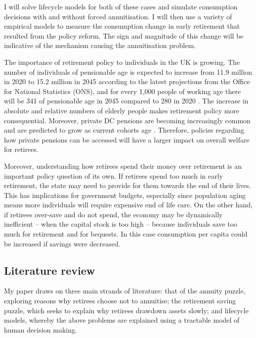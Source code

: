 \documentclass[12pt]{article}
\begin{document}
I will solve lifecycle models for both of these cases and simulate consumption
decisions with and without forced annuitisation. I will then use a variety of
empirical models to measure the consumption change in early retirement that
resulted from the policy reform. The sign and magnitude of this change will be
indicative of the mechanism causing the annuitisation problem.

The importance of retirement policy to individuals in the UK is growing. The
number of individuals of pensionable age is expected to increase from 11.9
million in 2020 to 15.2 million in 2045 according to the latest projections from
the Office for National Statistics (ONS), and for every 1,000 people of working
age there will be 341 of pensionable age in 2045 compared to 280 in 2020
\citep{ons_population_predictions_2020}. The increase in absolute and relative
numbers of elderly people makes retirement policy more consequential. Moreover,
private DC pensions are becoming increasingly common and are predicted to grow
as current cohorts age \citep{cribb_karjalainen_ifs_2023}. Therefore, policies
regarding how private pensions can be accessed will have a larger impact on
overall welfare for retirees.

Moreover, understanding how retirees spend their money over retirement is an
important policy question of its own. If retirees spend too much in early
retirement, the state may need to provide for them towards the end of their
lives. This has implications for government budgets, especially since population
aging means more individuals will require expensive end of life care. On the
other hand, if retirees over-save and do not spend, the economy may be
dynamically inefficient -- when the capital stock is too high -- because
individuals save too much for retirement and for bequests. In this case
consumption per capita could be increased if savings were decreased.


\subsection{Literature review}
My paper draws on three main strands of literature: that of the annuity puzzle,
exploring reasons why retirees choose not to annuitise; the retirement
saving puzzle, which seeks to explain why retirees drawdown assets slowly; and
lifecycle models, whereby the above problems are explained using a tractable
model of human decision making.
\end{document}
